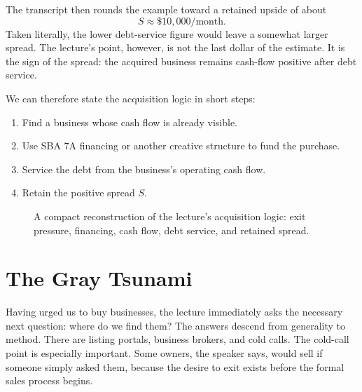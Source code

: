 The transcript then rounds the example toward a retained upside of about
\begin{equation}
S \approx \$10{,}000/\text{month}.
\end{equation}
Taken literally, the lower debt-service figure would leave a somewhat larger spread. The lecture's point, however, is not the last dollar of the estimate. It is the sign of the spread: the acquired business remains cash-flow positive after debt service.

We can therefore state the acquisition logic in short steps:
\begin{enumerate}
\item Find a business whose cash flow is already visible.
\item Use SBA \(7\)A financing or another creative structure to fund the purchase.
\item Service the debt from the business's operating cash flow.
\item Retain the positive spread \(S\).
\end{enumerate}

\begin{figure}[h]
\centering
{}
\caption{A compact reconstruction of the lecture's acquisition logic: exit pressure, financing, cash flow, debt service, and retained spread.}
\end{figure}

\section{The Gray Tsunami}

Having urged us to buy businesses, the lecture immediately asks the necessary next question: where do we find them? The answers descend from generality to method. There are listing portals, business brokers, and cold calls. The cold-call point is especially important. Some owners, the speaker says, would sell if someone simply asked them, because the desire to exit exists before the formal sales process begins.


